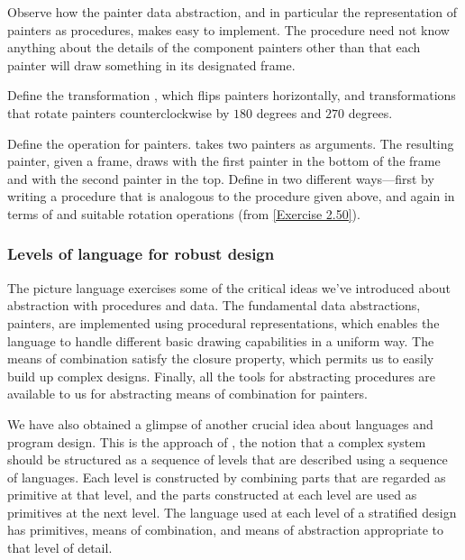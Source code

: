 Observe how the painter data abstraction, and in particular the representation of painters as procedures, makes  easy to implement.
The  procedure need not know anything about the details of the component painters other than that each painter will draw something in its designated frame.

\begin{exercise}
	\label{Exercise 2.50}
	Define the transformation , which flips painters horizontally, and transformations that rotate painters counterclockwise by \( 180 \) degrees and \( 270 \) degrees.
\end{exercise}



\begin{exercise}
	\label{Exercise 2.51}
	Define the  operation for painters.
	 takes two painters as arguments.
	The resulting painter, given a frame, draws with the first painter in the bottom of the frame and with the second painter in the top.
	Define  in two different ways---first by writing a procedure that is analogous to the  procedure given above, and again in terms of  and suitable rotation operations (from \cref{Exercise 2.50}).
\end{exercise}



\subsubsection*{Levels of language for robust design}

The picture language exercises some of the critical ideas we’ve introduced about abstraction with procedures and data.
The fundamental data abstractions, painters, are implemented using procedural representations, which enables the language to handle different basic drawing capabilities in a uniform way.
The means of combination satisfy the closure property, which permits us to easily build up complex designs.
Finally, all the tools for abstracting procedures are available to us for abstracting means of combination for painters.

We have also obtained a glimpse of another crucial idea about languages and program design.
This is the approach of , the notion that a complex system should be structured as a sequence of levels that are described using a sequence of languages.
Each level is constructed by combining parts that are regarded as primitive at that level, and the parts constructed at each level are used as primitives at the next level.
The language used at each level of a stratified design has primitives, means of combination, and means of abstraction appropriate to that level of detail.


